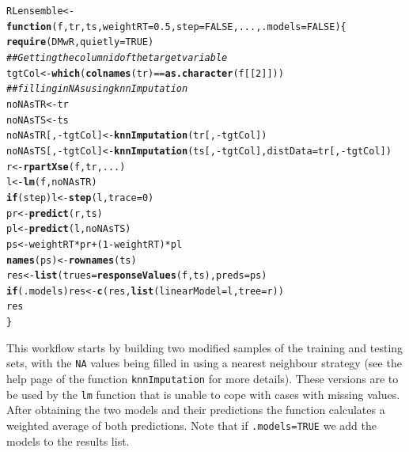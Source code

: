 \documentclass[10pt,a4paper]{article}\usepackage[]{graphicx}\usepackage[]{color}
\makeatletter
\newcommand{\hlnum}[1]{\textcolor[rgb]{0.686,0.059,0.569}{#1}}%
\newcommand{\hlcom}[1]{\textcolor[rgb]{0.678,0.584,0.686}{\textit{#1}}}%
\newcommand{\hlopt}[1]{\textcolor[rgb]{0,0,0}{#1}}%
\newcommand{\hlstd}[1]{\textcolor[rgb]{0.345,0.345,0.345}{#1}}%
\newcommand{\hlkwa}[1]{\textcolor[rgb]{0.161,0.373,0.58}{\textbf{#1}}}%
\newcommand{\hlkwb}[1]{\textcolor[rgb]{0.69,0.353,0.396}{#1}}%
\newcommand{\hlkwc}[1]{\textcolor[rgb]{0.333,0.667,0.333}{#1}}%
\newcommand{\hlkwd}[1]{\textcolor[rgb]{0.737,0.353,0.396}{\textbf{#1}}}%
\newenvironment{kframe}{%
 \def\at@end@of@kframe{}%
 \ifinner\ifhmode%
  \def\at@end@of@kframe{\end{minipage}}%
  \begin{minipage}{\columnwidth}%
 \fi\fi%
 \def\FrameCommand##1{\hskip\@totalleftmargin \hskip-\fboxsep
 \colorbox{shadecolor}{##1}\hskip-\fboxsep
     \hskip-\linewidth \hskip-\@totalleftmargin \hskip\columnwidth}%
 \MakeFramed {\advance\hsize-\width
   \@totalleftmargin\z@ \linewidth\hsize
   \@setminipage}}%
 {\par\unskip\endMakeFramed%
 \at@end@of@kframe}
\newenvironment{knitrout}{}{} %
\makeatother
\begin{document}
\begin{knitrout}\footnotesize
{}\color{fgcolor}\begin{kframe}
\begin{alltt}
\hlstd{RLensemble} \hlkwb{<-} \hlkwa{function}\hlstd{(}\hlkwc{f}\hlstd{,} \hlkwc{tr}\hlstd{,} \hlkwc{ts}\hlstd{,} \hlkwc{weightRT}\hlstd{=}\hlnum{0.5}\hlstd{,} \hlkwc{step}\hlstd{=}\hlnum{FALSE}\hlstd{,} \hlkwc{...}\hlstd{,} \hlkwc{.models}\hlstd{=}\hlnum{FALSE}\hlstd{) \{}
  \hlkwd{require}\hlstd{(DMwR,}\hlkwc{quietly}\hlstd{=}\hlnum{TRUE}\hlstd{)}
  \hlcom{## Getting the column id of the target variable}
  \hlstd{tgtCol} \hlkwb{<-} \hlkwd{which}\hlstd{(}\hlkwd{colnames}\hlstd{(tr)} \hlopt{==} \hlkwd{as.character}\hlstd{(f[[}\hlnum{2}\hlstd{]]))}
  \hlcom{## filling in NAs using knnImputation}
  \hlstd{noNAsTR} \hlkwb{<-} \hlstd{tr}
  \hlstd{noNAsTS} \hlkwb{<-} \hlstd{ts}
  \hlstd{noNAsTR[,}\hlopt{-}\hlstd{tgtCol]} \hlkwb{<-} \hlkwd{knnImputation}\hlstd{(tr[,}\hlopt{-}\hlstd{tgtCol])}
  \hlstd{noNAsTS[,}\hlopt{-}\hlstd{tgtCol]} \hlkwb{<-} \hlkwd{knnImputation}\hlstd{(ts[,}\hlopt{-}\hlstd{tgtCol],}\hlkwc{distData}\hlstd{=tr[,}\hlopt{-}\hlstd{tgtCol])}
  \hlstd{r} \hlkwb{<-} \hlkwd{rpartXse}\hlstd{(f,tr,...)}
  \hlstd{l} \hlkwb{<-} \hlkwd{lm}\hlstd{(f,noNAsTR)}
  \hlkwa{if} \hlstd{(step) l} \hlkwb{<-} \hlkwd{step}\hlstd{(l,}\hlkwc{trace}\hlstd{=}\hlnum{0}\hlstd{)}
  \hlstd{pr} \hlkwb{<-} \hlkwd{predict}\hlstd{(r,ts)}
  \hlstd{pl} \hlkwb{<-} \hlkwd{predict}\hlstd{(l,noNAsTS)}
  \hlstd{ps} \hlkwb{<-} \hlstd{weightRT}\hlopt{*}\hlstd{pr}\hlopt{+}\hlstd{(}\hlnum{1}\hlopt{-}\hlstd{weightRT)}\hlopt{*}\hlstd{pl}
  \hlkwd{names}\hlstd{(ps)} \hlkwb{<-} \hlkwd{rownames}\hlstd{(ts)}
  \hlstd{res} \hlkwb{<-} \hlkwd{list}\hlstd{(}\hlkwc{trues}\hlstd{=}\hlkwd{responseValues}\hlstd{(f,ts),}\hlkwc{preds}\hlstd{=ps)}
  \hlkwa{if} \hlstd{(.models) res} \hlkwb{<-} \hlkwd{c}\hlstd{(res,}\hlkwd{list}\hlstd{(}\hlkwc{linearModel}\hlstd{=l,}\hlkwc{tree}\hlstd{=r))}
  \hlstd{res}
\hlstd{\}}
\end{alltt}
\end{kframe}
\end{knitrout}

This workflow starts by building two modified samples of the training
and testing sets, with the \texttt{NA} values being filled in using a
nearest neighbour strategy (see the help page of the function
\texttt{knnImputation} for more
details). These versions are to be used by the \texttt{lm} function
that is unable to cope with cases with missing values. After obtaining
the two models and their predictions the function calculates a
weighted average of both predictions. Note that if \texttt{.models=TRUE} we add the models to the results list.
\end{document}
